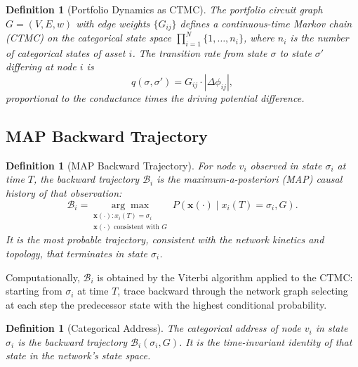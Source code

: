 \documentclass[twocolumn,10pt]{article}
\newtheorem{definition}[theorem]{Definition}
\theoremstyle{remark}
\begin{document}
\begin{definition}[Portfolio Dynamics as CTMC]
\label{def:portfolio_ctmc}
The portfolio circuit graph $G = (V, E, w)$ with edge weights $\{G_{ij}\}$ defines a continuous-time Markov chain (CTMC) on the categorical state space $\prod_{i=1}^N \{1, \ldots, n_i\}$, where $n_i$ is the number of categorical states of asset $i$.  The transition rate from state $\sigma$ to state $\sigma'$ differing at node $i$ is
\begin{equation}
    q(\sigma, \sigma') = G_{ij} \cdot |\Delta\phi_{ij}|,
    \label{eq:transition_rate}
\end{equation}
proportional to the conductance times the driving potential difference.
\end{definition}

\subsection{MAP Backward Trajectory}

\begin{definition}[MAP Backward Trajectory]
\label{def:backward_traj}
For node $v_i$ observed in state $\sigma_i$ at time $T$, the \emph{backward trajectory} $\mathcal{B}_i$ is the maximum-a-posteriori (MAP) causal history of that observation:
\begin{equation}
    \mathcal{B}_i = \underset{\substack{\mathbf{x}(\cdot) : x_i(T) = \sigma_i \\ \mathbf{x}(\cdot) \text{ consistent with } G}}{\arg\max} \; P\!\left(\mathbf{x}(\cdot) \mid x_i(T) = \sigma_i, G\right).
    \label{eq:backward_traj}
\end{equation}
It is the most probable trajectory, consistent with the network kinetics and topology, that terminates in state $\sigma_i$.
\end{definition}

Computationally, $\mathcal{B}_i$ is obtained by the Viterbi algorithm \cite{viterbi1967,forney1973} applied to the CTMC: starting from $\sigma_i$ at time $T$, trace backward through the network graph selecting at each step the predecessor state with the highest conditional probability.

\begin{definition}[Categorical Address]
\label{def:cat_address}
The \emph{categorical address} of node $v_i$ in state $\sigma_i$ is the backward trajectory $\mathcal{B}_i(\sigma_i, G)$.  It is the time-invariant identity of that state in the network's state space.
\end{definition}
\end{document}
